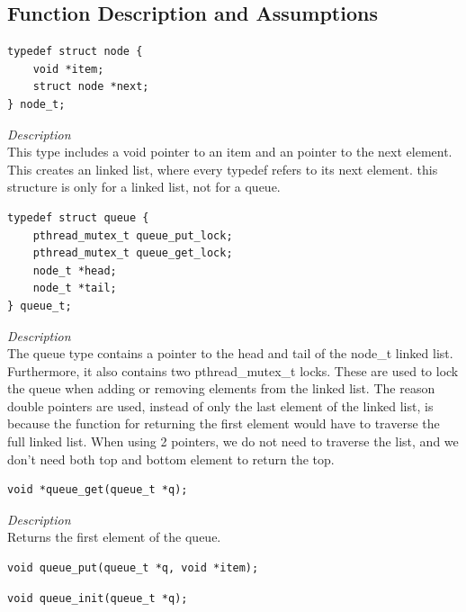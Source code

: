 \documentclass[11pt]{article}
\begin{document}
\subsection*{Function Description and Assumptions}


\begin{lstlisting}[style=customc]
typedef struct node {
    void *item;
    struct node *next;
} node_t;
\end{lstlisting}
\textit{Description} \\
This type includes a void pointer to an item and an pointer to the next element.
 This creates an linked list, where every typedef refers to its next element.
 this structure is only for a linked list, not for a queue.



\begin{lstlisting}[style=customc]
typedef struct queue {
    pthread_mutex_t queue_put_lock;
    pthread_mutex_t queue_get_lock;
    node_t *head;
    node_t *tail;
} queue_t;
\end{lstlisting}
\textit{Description} \\
The queue type contains a pointer to the head and tail of the node\_t linked list. Furthermore, it also 
contains two pthread\_mutex\_t locks. These are used to lock the queue when adding or removing elements
from the linked list. The reason double pointers are used, instead of only the last element of the linked list, is because the function for returning the first element would have to traverse the full linked list.
When using 2 pointers, we do not need to traverse the list, and we don't need both top and bottom element to return the top. 




\begin{lstlisting}[style=customc]
void *queue_get(queue_t *q);
\end{lstlisting}
\textit{Description} \\
Returns the first element of the queue.  



\begin{lstlisting}[style=customc]
void queue_put(queue_t *q, void *item);
\end{lstlisting}



\begin{lstlisting}[style=customc]
void queue_init(queue_t *q);
\end{lstlisting}
\end{document}
